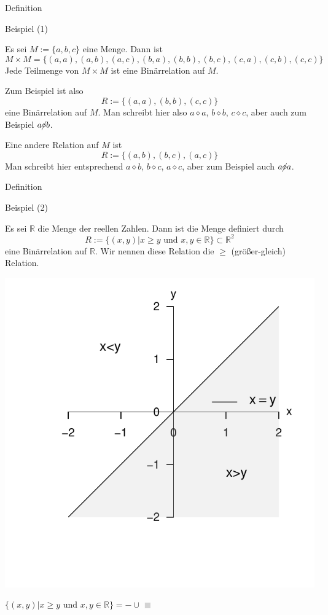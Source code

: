 \documentclass[
  8pt,
  ignorenonframetext,
]{beamer}
\begin{document}
\begin{frame}{Definition}
\protect\hypertarget{definition-4}{}
\small

Beispiel (1)

\footnotesize

Es sei \(M := \{a,b,c\}\) eine Menge. Dann ist \begin{equation}
M \times M = \{(a,a), (a,b), (a,c), (b,a), (b,b), (b,c), (c,a), (c,b), (c,c)\}
\end{equation} Jede Teilmenge von \(M \times M\) ist eine Binärrelation
auf \(M\).

Zum Beispiel ist also \begin{equation}
R := \{(a,a), (b,b), (c,c)\}
\end{equation} eine Binärrelation auf \(M\). Man schreibt hier also
\(a \diamond a\), \(b \diamond b\), \(c \diamond c\), aber auch zum
Beispiel \(a \cancel{\diamond}b\).

Eine andere Relation auf \(M\) ist \begin{equation}
R := \{(a,b), (b,c), (a,c)\}
\end{equation} Man schreibt hier entsprechend \(a \diamond b\),
\(b \diamond c\), \(a \diamond c\), aber zum Beispiel auch
\(a \cancel{\diamond}a\).
\end{frame}

\begin{frame}{Definition}
\protect\hypertarget{definition-5}{}
\small

Beispiel (2)

\footnotesize

Es sei \(\mathbb{R}\) die Menge der reellen Zahlen. Dann ist die Menge
definiert durch \begin{equation}
R := \{(x,y)|x \ge y \mbox{ und } x,y \in \mathbb{R}\} \subset \mathbb{R}^2
\end{equation} eine Binärrelation auf \(\mathbb{R}\). Wir nennen diese
Relation die \(\ge\) (größer-gleich) Relation. \vfill \large \center

\begin{center}\includegraphics[width=0.5\linewidth]{5_Abbildungen/pfm_5_ge} \end{center}
\vspace{-5mm}
\center
\footnotesize

\(\{(x,y)|x \ge y \mbox{ und } x,y \in \mathbb{R}\} = - \cup\)
\textcolor{lightgray}{$\blacksquare$}
\end{frame}
\end{document}
